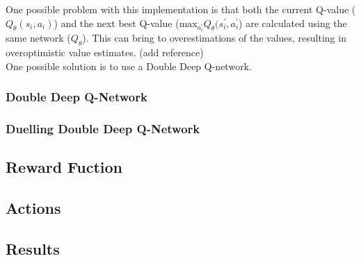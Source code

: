 \documentclass[14pt]{extarticle}
\def\sp{\vspace{5pt}}
\begin{document}
\begin{flushleft}
	One possible problem with this implementation is that both the current Q-value ($Q_{\theta}(s_i,a_i)$) and the next best Q-value ($\text{max}_{a_i^\prime}Q_{\theta}(s_i^{\prime},a_i^{\prime}$) are calculated using the same network ($Q_{\theta}$). This can bring to overestimations of the values, resulting in overoptimistic value estimates. (add reference)
	\\
	One possible solution is to use a Double Deep Q-network.
	\subsubsection{Double Deep Q-Network}
	\sp
	\subsubsection{Duelling Double Deep Q-Network}
	\sp
	
	
	\subsection{Reward Fuction} \label{rewardfuc}
	\sp
	\subsection{Actions}
	\sp

\end{flushleft}

\newpage
\begin{center}
	\section{Results}
	\sp
\end{center}
\begin{flushleft}
\end{flushleft}
\end{document}
